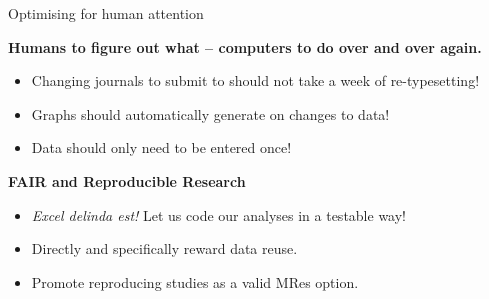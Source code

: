 \documentclass[aspectratio=1610, 11pt]{beamer} %
\begin{document}
{%
\begin{frame}{Optimising for human attention}


\textbf{Humans to figure out what -- computers to do over and over again.}

\begin{itemize}
    \item Changing journals to submit to should not take a week of re-typesetting!
    \item Graphs should automatically generate on changes to data! 
    \item Data should only need to be entered once!
\end{itemize}




\textbf{FAIR and Reproducible Research}

\begin{itemize}
    \item \textit{Excel delinda est!} Let us code our analyses in a testable way! \parencite{Krugman2013-ju, Ross2020-yg, Bruford2020-tw}
    \item Directly and specifically reward data reuse.
    \item Promote reproducing studies as a valid MRes option. \parencite{Spring2018-kr}
\end{itemize}



\end{frame}}
\end{document}
